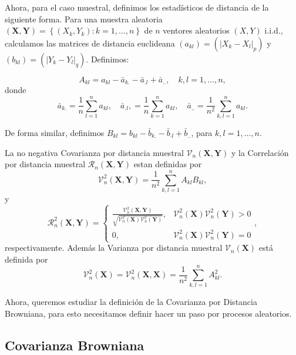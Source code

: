 	Ahora, para el caso muestral, definimos los estad\'isticos de distancia de la siguiente forma. Para una muestra aleatoria $(\mathbf{X}, \mathbf{Y})=\left\{\left(X_k, Y_k\right): k=1, \ldots, n\right\}$ de $n$ ventores aleatorios $(X, Y)$ i.i.d., calculamos las matrices de distancia euclideana  $\left(a_{k l}\right)=\left(\left|X_k-X_l\right|_p\right)$ y $\left(b_{k l}\right)=\left(\left|Y_k-Y_l\right|_q\right)$. Definimos:

	$$
	A_{k l}=a_{k l}-\bar{a}_{k .}-\bar{a}_{. l}+\bar{a}_{. .}, \quad k, l=1, \ldots, n,
	$$
	donde
	$$
	\bar{a}_{k .}=\frac{1}{n} \sum_{l=1}^n a_{k l}, \quad \bar{a}_{. l},=\frac{1}{n} \sum_{k=1}^n a_{k l}, \quad \bar{a}_{. .}=\frac{1}{n^2} \sum_{k, l=1}^n a_{k l} .
	$$
	
	De forma similar, definimos $B_{k l}=b_{k l}-\bar{b}_{k .}-\bar{b}_{\cdot l}+\bar{b}_{. .}$, para $k, l=1, \ldots, n$.

	\begin{defn}
		La no negativa Covarianza por distancia muestral $\mathcal{V}_n(\mathbf{X}, \mathbf{Y})$ y la Correlaci\'on por distancia muestral $\mathcal{R}_n(\mathbf{X}, \mathbf{Y})$ estan definidas por
		$$
		\mathcal{V}_n^2(\mathbf{X}, \mathbf{Y})=\frac{1}{n^2} \sum_{k, l=1}^n A_{k l} B_{k l},
		$$
		y
		$$
		\mathcal{R}_n^2(\mathbf{X}, \mathbf{Y})= \begin{cases}\frac{\mathcal{V}_n^2(\mathbf{X}, \mathbf{Y})}{\sqrt{\mathcal{V}_n^2(\mathbf{X}) \mathcal{V}_n^2(\mathbf{Y})}}, & \mathcal{V}_n^2(\mathbf{X}) \mathcal{V}_n^2(\mathbf{Y})>0 \\ 0, & \mathcal{V}_n^2(\mathbf{X}) \mathcal{V}_n^2(\mathbf{Y})=0\end{cases},
		$$
		respectivamente. Adem\'as la Varianza por distancia muestral $\mathcal{V}_n(\mathbf{X})$ est\'a definida por
		$$
		\mathcal{V}_n^2(\mathbf{X})=\mathcal{V}_n^2(\mathbf{X}, \mathbf{X})=\frac{1}{n^2} \sum_{k, l=1}^n A_{k l}^2 .
		$$
	\end{defn}

	Ahora, queremos estudiar la definici\'on de la Covarianza por Distancia Browniana, para esto necesitamos definir hacer un paso por procesos aleatorios. 

	\subsection{Covarianza Browniana}

